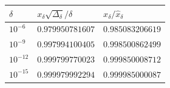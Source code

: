 \begin{center}
\begin{tabular}{@{}lll@{}}
\toprule
\(\delta\) & \(x_\delta\sqrt{\Delta_\delta}/\delta\) & \(x_\delta/\widehat x_\delta\)\\
\midrule
\(10^{-6}\) & \(0.979950781607\) & \(0.985083206619\)\\
\(10^{-9}\) & \(0.997994100405\) & \(0.998500862499\)\\
\(10^{-12}\) & \(0.999799770023\) & \(0.999850008712\)\\
\(10^{-15}\) & \(0.999979992294\) & \(0.999985000087\)\\
\bottomrule
\end{tabular}
\end{center}
